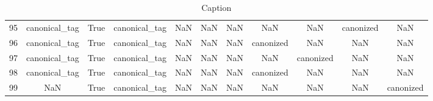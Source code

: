 \begin{table}[h!]
{\begin{tabular}{|c|c|c|c|c|c|c|c|c|c|c|}
         95 &             canonical\_tag &                              True &                canonical\_tag &                                  NaN &                                  NaN &                                  NaN &                                  NaN &                                  NaN &                            canonized &                                                NaN \\
         96 &             canonical\_tag &                              True &                canonical\_tag &                                  NaN &                                  NaN &                                  NaN &                            canonized &                                  NaN &                                  NaN &                                                NaN \\
         97 &             canonical\_tag &                              True &                canonical\_tag &                                  NaN &                                  NaN &                                  NaN &                                  NaN &                            canonized &                                  NaN &                                                NaN \\
         98 &             canonical\_tag &                              True &                canonical\_tag &                                  NaN &                                  NaN &                                  NaN &                            canonized &                                  NaN &                                  NaN &                                                NaN \\
         99 &                       NaN &                              True &                canonical\_tag &                                  NaN &                                  NaN &                                  NaN &                                  NaN &                                  NaN &                                  NaN &                                          canonized \\
\hline
\end{tabular}}
 \caption{Caption}
 \label{tab:my_label}
\end{table}
